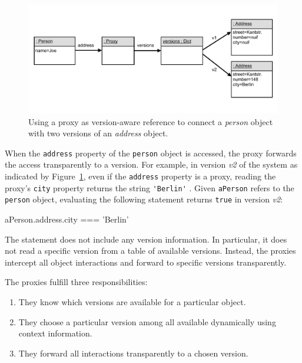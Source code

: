 \begin{figure}[h]
    \centering
    \includegraphics[width=\textwidth]{figures/4_approach/7_proxyBasedVersionAwareReference.pdf}
    \caption{Using a proxy as version-aware reference to connect a \emph{person} object with two versions of an \emph{address} object.}
    \label{fig:ProxyBasedVersionAwareReference}
\end{figure}

When the \lstinline{address} property of the \lstinline{person} object is accessed, the proxy forwards the access transparently to a version.
For example, in version \emph{v2} of the system as indicated by Figure~\ref{fig:ProxyBasedVersionAwareReference}, even if the \lstinline{address} property is a proxy, reading the proxy's \lstinline{city} property returns the string \lstinline{'Berlin'} .
Given \lstinline{aPerson} refers to the \lstinline{person} object, evaluating the following statement returns \lstinline{true} in version \emph{v2}:

\begin{code}{}{}
aPerson.address.city === 'Berlin'
\end{code}
\iffalse
\end{verbatim}\fi

The statement does not include any version information.
In particular, it does not read a specific version from a table of available versions.
Instead, the proxies intercept all object interactions and forward to specific versions transparently.

The proxies fulfill three responsibilities:
\begin{enumerate}
    \item They know which versions are available for a particular object.
    \item They choose a particular version among all available dynamically using context information.
    \item They forward all interactions transparently to a chosen version.
\end{enumerate}

